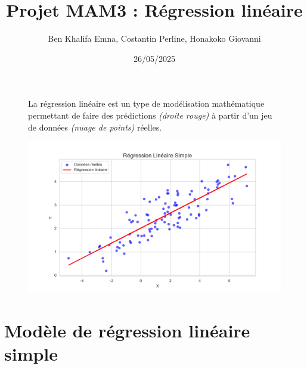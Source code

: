 \documentclass[12pt]{article}
\title{Projet MAM3 : Régression linéaire}
\author{Ben Khalifa Emna, Costantin Perline, Honakoko Giovanni}
\date{26/05/2025}
\begin{document}
	\maketitle
	
	\vspace{2cm}
	
\begin{figure}[hbtp]
	\centering
	\noindent
	
	\begin{minipage}[t]{0.35\textwidth}
		\vspace{0pt} %
		\small
		La régression linéaire est un type de modélisation mathématique permettant de faire des prédictions \textit{(droite rouge)} à partir d’un jeu de données \textit{(nuage de points)} réelles.
	\end{minipage}
	\hfill
	\begin{minipage}[t]{0.6\textwidth}
		\vspace{0pt} %
		\includegraphics[width=\linewidth]{img/regress_simple1.png}
	\end{minipage}%

\end{figure}
	
	
	
	\newpage
	\tableofcontents
	
	\section{Modèle de régression linéaire simple}
\end{document}
